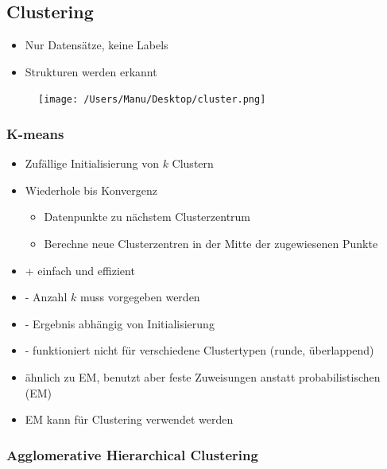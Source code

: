 \documentclass[paper=a4, fontsize=11pt]{scrartcl} %
\numberwithin{equation}{section} %
\numberwithin{figure}{section} %
\numberwithin{table}{section} %
\begin{document}
\subsection{Clustering}

\begin{minipage}{0.5\textwidth}
\begin{itemize}
\item Nur Datensätze, keine Labels
\item Strukturen werden erkannt
\end{itemize}
\end{minipage} \hfill
\begin{minipage}{0.45\textwidth}
\begin{figure}[H]
\texttt{[image: /Users/Manu/Desktop/cluster.png]}
\end{figure}
\end{minipage}

\subsubsection{K-means}

\begin{itemize}
\item Zufällige Initialisierung von $k$ Clustern
\item Wiederhole bis Konvergenz
\begin{itemize}
\item Datenpunkte zu nächstem Clusterzentrum
\item Berechne neue Clusterzentren in der Mitte der zugewiesenen Punkte
\end{itemize}
\item + einfach und effizient
\item - Anzahl $k$ muss vorgegeben werden
\item - Ergebnis abhängig von Initialisierung
\item - funktioniert nicht für verschiedene Clustertypen (runde, überlappend)
\item ähnlich zu EM, benutzt aber feste Zuweisungen anstatt probabilistischen (EM)
\item EM kann für Clustering verwendet werden
\end{itemize}

\subsubsection{Agglomerative Hierarchical Clustering}
\end{document}
